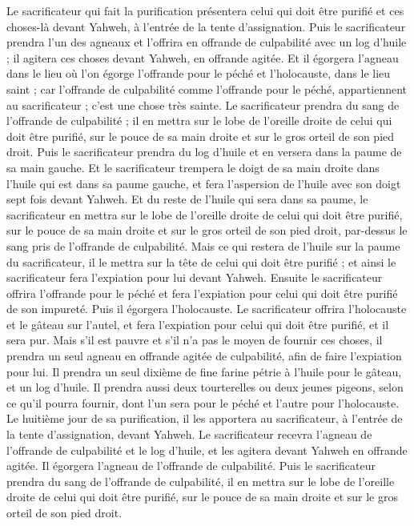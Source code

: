 \begin{multicols}{2}
Le sacrificateur qui fait la purification présentera celui qui doit être purifié et ces choses-là devant Yahweh, à l'entrée de la tente d'assignation.
Puis le sacrificateur prendra l'un des agneaux et l'offrira en offrande de culpabilité avec un log d'huile ; il agitera ces choses devant Yahweh, en offrande agitée.
Et il égorgera l'agneau dans le lieu où l'on égorge l'offrande pour le péché et l'holocauste, dans le lieu saint ; car l'offrande de culpabilité comme l'offrande pour le péché, appartiennent au sacrificateur ; c'est une chose très sainte.
Le sacrificateur prendra du sang de l'offrande de culpabilité ; il en mettra sur le lobe de l'oreille droite de celui qui doit être purifié, sur le pouce de sa main droite et sur le gros orteil de son pied droit.
Puis le sacrificateur prendra du log d’huile et en versera dans la paume de sa main gauche.
Et le sacrificateur trempera le doigt de sa main droite dans l'huile qui est dans sa paume gauche, et fera l’aspersion de l'huile avec son doigt sept fois devant Yahweh.
Et du reste de l'huile qui sera dans sa paume, le sacrificateur en mettra sur le lobe de l'oreille droite de celui qui doit être purifié, sur le pouce de sa main droite et sur le gros orteil de son pied droit, par-dessus le sang pris de l'offrande de culpabilité.
Mais ce qui restera de l'huile sur la paume du sacrificateur, il le mettra sur la tête de celui qui doit être purifié ; et ainsi le sacrificateur fera l’expiation pour lui devant Yahweh.
Ensuite le sacrificateur offrira l'offrande pour le péché et fera l’expiation pour celui qui doit être purifié de son impureté. Puis il égorgera l'holocauste.
Le sacrificateur offrira l'holocauste et le gâteau sur l'autel, et fera l’expiation pour celui qui doit être purifié, et il sera pur.
Mais s'il est pauvre et s'il n'a pas le moyen de fournir ces choses, il prendra un seul agneau en offrande agitée de culpabilité, afin de faire l’expiation pour lui. Il prendra un seul dixième de fine farine pétrie à l'huile pour le gâteau, et un log d'huile.
Il prendra aussi deux tourterelles ou deux jeunes pigeons, selon ce qu'il pourra fournir, dont l'un sera pour le péché et l'autre pour l'holocauste.
Le huitième jour de sa purification, il les apportera au sacrificateur, à l'entrée de la tente d'assignation, devant Yahweh.
Le sacrificateur recevra l'agneau de l'offrande de culpabilité et le log d'huile, et les agitera devant Yahweh en offrande agitée.
Il égorgera l'agneau de l'offrande de culpabilité. Puis le sacrificateur prendra du sang de l'offrande de culpabilité, il en mettra sur le lobe de l'oreille droite de celui qui doit être purifié, sur le pouce de sa main droite et sur le gros orteil de son pied droit.

\end{multicols}
